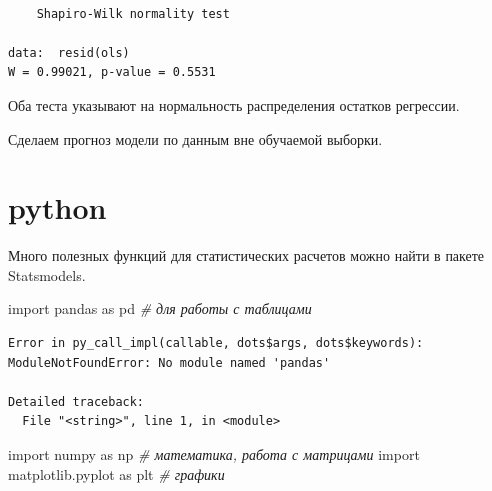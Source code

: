 \documentclass[]{book}
\newenvironment{Shaded}{\begin{snugshade}}{\end{snugshade}}
\newcommand{\CommentTok}[1]{\textcolor[rgb]{0.56,0.35,0.01}{\textit{#1}}}
\newcommand{\DataTypeTok}[1]{\textcolor[rgb]{0.13,0.29,0.53}{#1}}
\newcommand{\DecValTok}[1]{\textcolor[rgb]{0.00,0.00,0.81}{#1}}
\newcommand{\FloatTok}[1]{\textcolor[rgb]{0.00,0.00,0.81}{#1}}
\newcommand{\ImportTok}[1]{#1}
\newcommand{\KeywordTok}[1]{\textcolor[rgb]{0.13,0.29,0.53}{\textbf{#1}}}
\newcommand{\NormalTok}[1]{#1}
\newcommand{\OperatorTok}[1]{\textcolor[rgb]{0.81,0.36,0.00}{\textbf{#1}}}
\newcommand{\OtherTok}[1]{\textcolor[rgb]{0.56,0.35,0.01}{#1}}
\newcommand{\StringTok}[1]{\textcolor[rgb]{0.31,0.60,0.02}{#1}}
\begin{document}
\begin{verbatim}

    Shapiro-Wilk normality test

data:  resid(ols)
W = 0.99021, p-value = 0.5531
\end{verbatim}

Оба теста указывают на нормальность распределения остатков регрессии.

Сделаем прогноз модели по данным вне обучаемой выборки.

\begin{Shaded}
\end{Shaded}

\hypertarget{python}{%
\section{python}\label{python}}

Много полезных функций для статистических расчетов можно найти в пакете Statsmodels.

\begin{Shaded}
\begin{Highlighting}[]

\ImportTok{import}\NormalTok{ pandas }\ImportTok{as}\NormalTok{ pd }\CommentTok{# для работы с таблицами}
\end{Highlighting}
\end{Shaded}

\begin{verbatim}
Error in py_call_impl(callable, dots$args, dots$keywords): ModuleNotFoundError: No module named 'pandas'

Detailed traceback: 
  File "<string>", line 1, in <module>
\end{verbatim}

\begin{Shaded}
\begin{Highlighting}[]
\ImportTok{import}\NormalTok{ numpy }\ImportTok{as}\NormalTok{ np }\CommentTok{# математика, работа с матрицами}
\ImportTok{import}\NormalTok{ matplotlib.pyplot }\ImportTok{as}\NormalTok{ plt }\CommentTok{# графики}
\end{Highlighting}
\end{Shaded}
\end{document}
